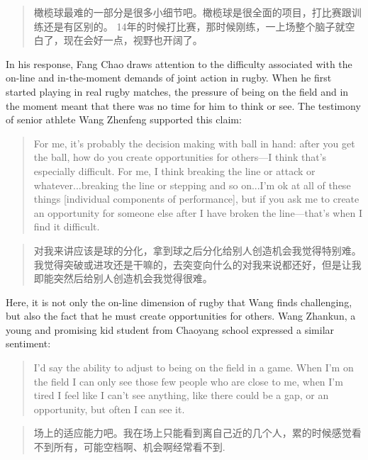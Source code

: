 \begin{CJK}{UTF8}{gbsn}
\begin{quote}
  橄榄球最难的一部分是很多小细节吧。橄榄球是很全面的项目，打比赛跟训练还是有区别的。 14年的时候打比赛，那时候刚练，一上场整个脑子就空白了，现在会好一点，视野也开阔了。
\end{quote}

In his response, Fang Chao draws attention to the difficulty associated with the on-line and in-the-moment demands of joint action in rugby.  When he first started playing in real rugby matches, the pressure of being on the field and in the moment meant that there was no time for him to think or see.  The testimony of senior athlete Wang Zhenfeng supported this claim:

\begin{quote}
  For me, it's probably the decision making with ball in hand: after you get the ball, how do you create opportunities for others---I think that's especially difficult.  For me, I think breaking the line or attack or whatever...breaking the line or stepping and so on...I'm ok at all of these things [individual components of performance], but if you ask me to create an opportunity for someone else after I have broken the line---that's when I find it difficult.
\end{quote}

\begin{quote}
  对我来讲应该是球的分化，拿到球之后分化给别人创造机会我觉得特别难。我觉得突破或进攻还是干嘛的，去突变向什么的对我来说都还好，但是让我即能突然后给别人创造机会我觉得很难。
\end{quote}

Here, it is not only the on-line dimension of rugby that Wang finds challenging, but also the fact that he must create opportunities for others.  Wang Zhankun, a young and promising kid student from Chaoyang school expressed a similar sentiment:

\begin{quote}
  I’d say the ability to adjust to being on the field in a game.  When I’m on the field I can only see those few people who are close to me, when I’m tired I feel like I can’t see anything, like there could be a gap, or an opportunity, but often I can see it.
\end{quote}

\begin{quote}
  场上的适应能力吧。我在场上只能看到离自己近的几个人，累的时候感觉看不到所有，可能空档啊、机会啊经常看不到.
\end{quote}


\end{CJK}
